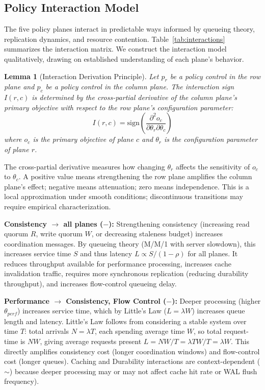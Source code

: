 \documentclass[conference]{IEEEtran}
\newtheorem{lemma}[theorem]{Lemma}
\begin{document}
{\subsection{Policy Interaction Model}

{\color{red}
The five policy planes interact in predictable ways informed by queueing theory, replication dynamics, and resource contention. Table~\ref{tab:interactions} summarizes the interaction matrix. We construct the interaction model qualitatively, drawing on established understanding of each plane's behavior.

\begin{lemma}[Interaction Derivation Principle]
Let $p_r$ be a policy control in the row plane and $p_c$ be a policy control in the column plane. The interaction sign $I(r,c)$ is determined by the cross-partial derivative of the column plane's primary objective with respect to the row plane's configuration parameter:
\begin{equation}
I(r,c) = \text{sign}\left(\frac{\partial^2 o_c}{\partial \theta_r \partial \theta_c}\right)
\label{eq:interaction}
\end{equation}
where $o_c$ is the primary objective of plane $c$ and $\theta_r$ is the configuration parameter of plane $r$.
\end{lemma}

The cross-partial derivative measures how changing $\theta_r$ affects the sensitivity of $o_c$ to $\theta_c$. A positive value means strengthening the row plane amplifies the column plane's effect; negative means attenuation; zero means independence. This is a local approximation under smooth conditions; discontinuous transitions may require empirical characterization.

\textbf{Consistency $\to$ all planes ($-$):} Strengthening consistency (increasing read quorum $R$, write quorum $W$, or decreasing staleness budget) increases coordination messages. By queueing theory (M/M/1 with server slowdown), this increases service time $S$ and thus latency $L \propto S/(1-\rho)$ for all planes. It reduces throughput available for performance processing, increases cache invalidation traffic, requires more synchronous replication (reducing durability throughput), and increases flow-control queueing delay.}

{\color{red}
\textbf{Performance $\to$ Consistency, Flow Control ($-$):} Deeper processing (higher $\theta_{perf}$) increases service time, which by Little's Law ($L = \lambda W$) increases queue length and latency. Little's Law follows from considering a stable system over time $T$: total arrivals $N = \lambda T$, each spending average time $W$, so total request-time is $NW$, giving average requests present $L = NW/T = \lambda TW/T = \lambda W$. This directly amplifies consistency cost (longer coordination windows) and flow-control cost (longer queues). Caching and Durability interactions are context-dependent ($\sim$) because deeper processing may or may not affect cache hit rate or WAL flush frequency).

}}
\end{document}
